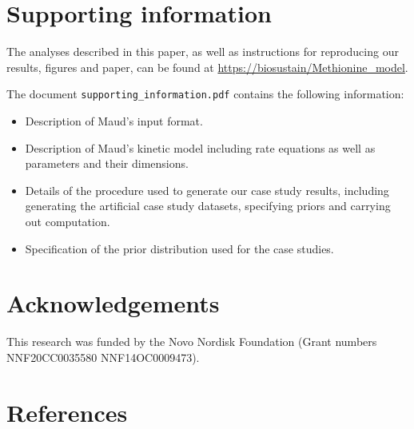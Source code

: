 \documentclass[journal=asbcd6,manuscript=article,layout=traditional]{achemso}
\providecommand{\tightlist}{%
  \setlength{\itemsep}{0pt}\setlength{\parskip}{0pt}}\usepackage{longtable,booktabs,array}
\begin{document}
\hypertarget{supporting-information}{%
\section{Supporting information}\label{supporting-information}}

The analyses described in this paper, as well as instructions for
reproducing our results, figures and paper, can be found at
\url{https://biosustain/Methionine_model}.

The document \texttt{supporting\_information.pdf} contains the following
information:

\begin{itemize}
\tightlist
\item
  Description of Maud's input format.
\item
  Description of Maud's kinetic model including rate equations as well
  as parameters and their dimensions.
\item
  Details of the procedure used to generate our case study results,
  including generating the artificial case study datasets, specifying
  priors and carrying out computation.
\item
  Specification of the prior distribution used for the case studies.
\end{itemize}

\hypertarget{acknowledgements}{%
\section{Acknowledgements}\label{acknowledgements}}

This research was funded by the Novo Nordisk Foundation (Grant numbers
NNF20CC0035580 NNF14OC0009473).

\hypertarget{references}{%
\section{References}\label{references}}

\renewcommand{\bibsection}{}

\end{document}
